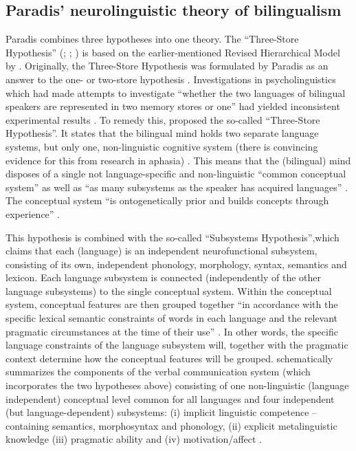 \subsection{Paradis’ neurolinguistic theory of bilingualism}
\label{sec:5.3.1}  
Paradis combines three hypotheses into one theory. The “Three-Store Hypothesis” (\citeyear{paradis_bilingual_1978,paradis_language_1980}; \citeyear[195--203]{paradis_neurolinguistic_2004}; \citeyear[3--28]{kecskes_neurofunctional_2007}) is based on the earlier-mentioned Revised Hierarchical Model by \citet{kroll_category_1994}. Originally, the Three-Store Hypothesis was formulated by Paradis as an answer to the one- or two-store hypothesis \citep{kolers_bilingualism_1968,hornby_bilingual_1977}. Investigations in psycholinguistics which had made attempts to investigate “whether the two languages of bilingual speakers are represented in two memory stores or one” had yielded inconsistent experimental results \citep[6]{kecskes_neurofunctional_2007}. To remedy this, \citet{paradis_bilingual_1978, paradis_language_1980} proposed the so-called “Three-Store Hypothesis”. It states that the bilingual mind holds two separate language systems, but only one, non-linguistic cognitive system (there is convincing evidence for this from research in aphasia) \citep[196]{paradis_neurolinguistic_2004}. This means that the (bilingual) mind disposes of a single not language-specific and non-linguistic “common conceptual system” as well as “as many subsystems as the speaker has acquired languages” \citep[3]{kecskes_neurofunctional_2007}. The conceptual system “is ontogenetically prior and builds concepts through experience” \citep[198]{paradis_neurolinguistic_2004}.

This hypothesis is combined with the so-called “Subsystems Hypothesis”,\linebreak which claims that each (language) is an independent neurofunctional subsystem, consisting of its own, independent phonology, morphology, syntax, semantics and lexicon. Each language subsystem is connected (independently of the other language subsystems) to the single conceptual system. Within the conceptual system, conceptual features are then grouped together “in accordance with the specific lexical semantic constraints of words in each language and the relevant pragmatic circumstances at the time of their use” \citep[3]{kecskes_neurofunctional_2007}. In other words, the specific language constraints of the language subsystem will, together with the pragmatic context determine how the conceptual features will be grouped.  schematically summarizes the components of the verbal communication system (which incorporates the two hypotheses above) consisting of one non-linguistic (language independent) conceptual level common for all languages and four independent (but language-dependent) subsystems: (i) implicit linguistic competence – containing semantics, morphosyntax and phonology, (ii) explicit metalinguistic knowledge (iii) pragmatic ability and (iv) motivation\slash affect \citep[3]{paradis_neurolinguistic_2004, kecskes_neurofunctional_2007}.

